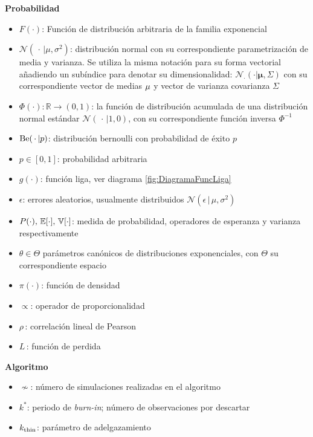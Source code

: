 \documentclass[../../Main/Main.tex]{subfiles}
\begin{document}
\textbf{Probabilidad}
\begin{itemize}[label={}]
	\item $F(\cdot)$: Función de distribución arbitraria de la familia exponencial
	\item $\mathcal{N}(\,\cdot\,|\mu,\sigma^2)$: distribución normal con su correspondiente parametrización de media y varianza. Se utiliza la misma notación para su forma vectorial añadiendo un subíndice para denotar su dimensionalidad: $\mathcal{N}_{\cdot}(\cdot|\bm{\mu},\Sigma)$ con su correspondiente vector de medias $\bf{\mu}$ y vector de varianza covarianza $\Sigma$
	\item $\Phi(\cdot):\mathbb{R}\rightarrow(0,1)$: la función de distribución acumulada de una distribución normal estándar $\mathcal{N}(\,\cdot\,| 1,0)$, con su correspondiente función inversa $\Phi^{-1}$
	\item $\text{Be}(\,\cdot\,|p)$: distribución bernoulli con probabilidad de éxito $p$
	\item $p \in [0,1]$: probabilidad arbitraria
	\item $g(\cdot)$: función liga, ver diagrama \ref{fig:DiagramaFuncLiga}
	\item $\epsilon$: errores aleatorios, usualmente distribuidos $\mathcal{N}(\epsilon\,|\,\mu,\sigma^2)$
	\item $P(\cdot),\, \mathbb{E}[\cdot],\, \mathbb{V}[\cdot]$: medida de probabilidad, operadores de esperanza y varianza respectivamente
	\item $\theta \in \Theta$ parámetros canónicos de distribuciones exponenciales, con $\Theta$ su correspondiente espacio
	\item $\pi(\cdot)$: función de densidad
	\item $\propto$: operador de proporcionalidad
	\item $\rho\,$: correlación lineal de Pearson
	\item $L\,$: función de perdida
\end{itemize}
	
\textbf{Algoritmo}
\begin{itemize}[label={}]
	\item $\nsim$: número de simulaciones realizadas en el algoritmo
	\item $k^*$:  periodo de \textit{burn-in}; número de observaciones por descartar
	\item $k_{\text{thin}}$: parámetro de adelgazamiento 
\end{itemize}
\end{document}
